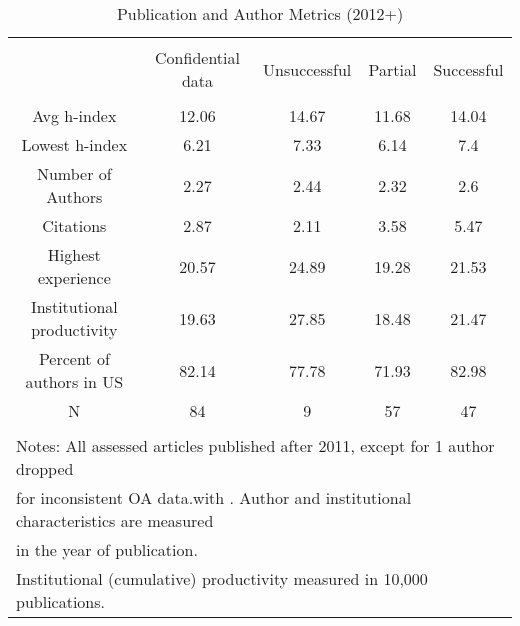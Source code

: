 
\begin{table}[!htbp] \centering 
  \caption{Publication and Author Metrics (2012+)} 
  \label{tab:metrics:OA:zero} 
\begin{tabular}{@{\extracolsep{0.4pt}} ccccc} 
\\[-1.8ex]\hline 
\hline \\[-1.8ex] 
  & Confidential data & Unsuccessful & Partial & Successful \\ 
\hline \\[-1.8ex] 
Avg h-index & 12.06 & 14.67 & 11.68 & 14.04 \\ 
Lowest h-index & 6.21 & 7.33 & 6.14 & 7.4 \\ 
Number of Authors & 2.27 & 2.44 & 2.32 & 2.6 \\ 
Citations & 2.87 & 2.11 & 3.58 & 5.47 \\ 
Highest experience & 20.57 & 24.89 & 19.28 & 21.53 \\ 
Institutional productivity & 19.63 & 27.85 & 18.48 & 21.47 \\ 
Percent of authors in US & 82.14 & 77.78 & 71.93 & 82.98 \\ 
N & 84 & 9 & 57 & 47 \\ 
\hline \\[-1.8ex] 
\multicolumn{5}{l}{Notes: All assessed articles published after 2011, except for 1 author dropped } \\ 
\multicolumn{5}{l}{for inconsistent OA data.with . Author and institutional characteristics are measured } \\ 
\multicolumn{5}{l}{in the year of publication. } \\ 
\multicolumn{5}{l}{Institutional (cumulative) productivity measured in 10,000 publications.} \\ 
\end{tabular} 
\end{table} 
